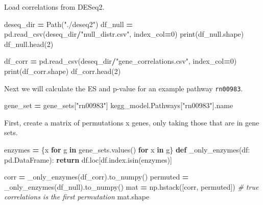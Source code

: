 \documentclass[
]{book}
\newenvironment{Shaded}{\begin{snugshade}}{\end{snugshade}}
\newcommand{\BuiltInTok}[1]{#1}
\newcommand{\CommentTok}[1]{\textcolor[rgb]{0.56,0.35,0.01}{\textit{#1}}}
\newcommand{\ControlFlowTok}[1]{\textcolor[rgb]{0.13,0.29,0.53}{\textbf{#1}}}
\newcommand{\DecValTok}[1]{\textcolor[rgb]{0.00,0.00,0.81}{#1}}
\newcommand{\KeywordTok}[1]{\textcolor[rgb]{0.13,0.29,0.53}{\textbf{#1}}}
\newcommand{\NormalTok}[1]{#1}
\newcommand{\OperatorTok}[1]{\textcolor[rgb]{0.81,0.36,0.00}{\textbf{#1}}}
\newcommand{\StringTok}[1]{\textcolor[rgb]{0.31,0.60,0.02}{#1}}
\begin{document}
Load correlations from DESeq2.

\begin{Shaded}
\begin{Highlighting}[numbers=left,,]
\NormalTok{deseq\_dir }\OperatorTok{=}\NormalTok{ Path(}\StringTok{"./deseq2"}\NormalTok{)}
\NormalTok{df\_null }\OperatorTok{=}\NormalTok{ pd.read\_csv(deseq\_dir}\OperatorTok{/}\StringTok{"null\_distr.csv"}\NormalTok{, index\_col}\OperatorTok{=}\DecValTok{0}\NormalTok{)}
\BuiltInTok{print}\NormalTok{(df\_null.shape)}
\NormalTok{df\_null.head(}\DecValTok{2}\NormalTok{)}
\end{Highlighting}
\end{Shaded}

\begin{Shaded}
\begin{Highlighting}[numbers=left,,]
\NormalTok{df\_corr }\OperatorTok{=}\NormalTok{ pd.read\_csv(deseq\_dir}\OperatorTok{/}\StringTok{"gene\_correlations.csv"}\NormalTok{, index\_col}\OperatorTok{=}\DecValTok{0}\NormalTok{)}
\BuiltInTok{print}\NormalTok{(df\_corr.shape)}
\NormalTok{df\_corr.head(}\DecValTok{2}\NormalTok{)}
\end{Highlighting}
\end{Shaded}

Next we will calculate the ES and p-value for an example pathway \texttt{rn00983}.

\begin{Shaded}
\begin{Highlighting}[numbers=left,,]
\NormalTok{gene\_set }\OperatorTok{=}\NormalTok{ gene\_sets[}\StringTok{"rn00983"}\NormalTok{]}
\NormalTok{kegg\_model.Pathways[}\StringTok{"rn00983"}\NormalTok{].name}
\end{Highlighting}
\end{Shaded}

First, create a matrix of permutations x genes, only taking those that are in gene sets.

\begin{Shaded}
\begin{Highlighting}[numbers=left,,]
\NormalTok{enzymes }\OperatorTok{=}\NormalTok{ \{x }\ControlFlowTok{for}\NormalTok{ g }\KeywordTok{in}\NormalTok{ gene\_sets.values() }\ControlFlowTok{for}\NormalTok{ x }\KeywordTok{in}\NormalTok{ g\}}
\KeywordTok{def}\NormalTok{ \_only\_enzymes(df: pd.DataFrame):}
    \ControlFlowTok{return}\NormalTok{ df.loc[df.index.isin(enzymes)]}

\NormalTok{corr }\OperatorTok{=}\NormalTok{ \_only\_enzymes(df\_corr).to\_numpy()}
\NormalTok{permuted }\OperatorTok{=}\NormalTok{ \_only\_enzymes(df\_null).to\_numpy()}
\NormalTok{mat }\OperatorTok{=}\NormalTok{ np.hstack([corr, permuted]) }\CommentTok{\# true correlations is the first permutation}
\NormalTok{mat.shape}
\end{Highlighting}
\end{Shaded}
\end{document}

